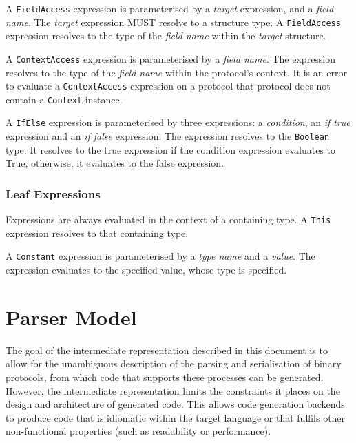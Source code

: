 \documentclass[10pt,twocolumn,a4paper]{article}
\newcommand{\code}[1]{\texttt{#1}}
\begin{document}
A \code{FieldAccess} expression is parameterised by a \emph{target} expression, and a
\emph{field name}. The \emph{target} expression MUST resolve to a structure type. A
\code{FieldAccess} expression resolves to the type of the \emph{field name} within the
\emph{target} structure.

A \code{ContextAccess} expression is parameterised by a \emph{field name}. The expression
resolves to the type of the \emph{field name} within the protocol's context.
It is an error to evaluate a \code{ContextAccess} expression on a protocol
that protocol does not contain a \code{Context} instance.

A \code{IfElse} expression is parameterised by three expressions: a \emph{condition},
an \emph{if true} expression and an \emph{if false} expression. The expression resolves
to the \code{Boolean} type. It resolves to the true expression if the condition
expression evaluates to True, otherwise, it evaluates to the false expression.

\subsubsection{Leaf Expressions}

Expressions are always evaluated in the context of a containing type.
A \code{This} expression resolves to that containing type.

A \code{Constant} expression is parameterised by a \emph{type name} and a \emph{value}.
The expression evaluates to the specified value, whose type is specified.

\section{Parser Model}
\label{sec:parser-model}

The goal of the intermediate representation described in this document is to
allow for the unambiguous description of the parsing and serialisation of
binary protocols, from which code that supports these processes can be
generated. However, the intermediate representation limits the constraints it
places on the design and architecture of generated code. This allows
code generation backends to produce code that is idiomatic within the target
language or that fulfils other non-functional properties (such as readability or
performance).
\end{document}
